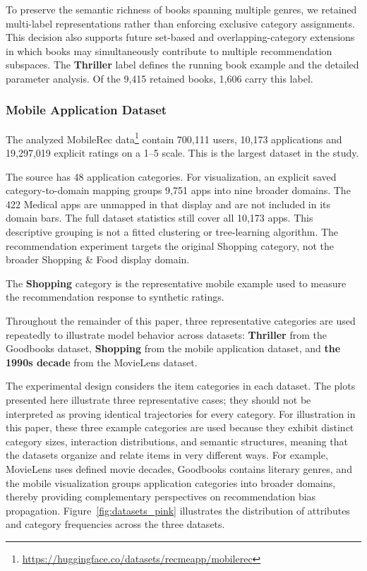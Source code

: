 \documentclass[information,article,submit,pdftex,moreauthors]{Definitions/mdpi}
\begin{document}
To preserve the semantic richness of books spanning multiple genres, we retained multi-label representations rather than enforcing exclusive category assignments. This decision also supports future set-based and overlapping-category extensions in which books may simultaneously contribute to multiple recommendation subspaces.
The \textbf{Thriller} label defines the running book example and the detailed parameter analysis. Of the 9,415 retained books, 1,606 carry this label. 
\label{sec:thriller-example}

\subsubsection{Mobile Application Dataset}

The analyzed MobileRec data\footnote{\url{https://huggingface.co/datasets/recmeapp/mobilerec}} contain 700,111 users, 10,173 applications and 19,297,019 explicit ratings on a 1--5 scale. This is the largest dataset in the study.

The source has 48 application categories. For visualization, an explicit saved category-to-domain mapping groups 9,751 apps into nine broader domains. The 422 Medical apps are unmapped in that display and are not included in its domain bars. The full dataset statistics still cover all 10,173 apps. This descriptive grouping is not a fitted clustering or tree-learning algorithm. The recommendation experiment targets the original Shopping category, not the broader Shopping \& Food display domain.

The \textbf{Shopping} category is the representative mobile example used to measure the recommendation response to synthetic ratings.

Throughout the remainder of this paper, three representative categories are used repeatedly to illustrate model behavior across datasets: \textbf{Thriller} from the Goodbooks dataset, \textbf{Shopping} from the mobile application dataset, and \textbf{the 1990s decade} from the MovieLens dataset.

The experimental design considers the item categories in each dataset. The plots presented here illustrate three representative cases; they should not be interpreted as proving identical trajectories for every category. For illustration in this paper, these three example categories are used because they exhibit distinct category sizes, interaction distributions, and semantic structures, meaning that the datasets organize and relate items in very different ways. For example, MovieLens uses defined movie decades, Goodbooks contains literary genres, and the mobile visualization groups application categories into broader domains, thereby providing complementary perspectives on recommendation bias propagation. Figure~\ref{fig:datasets_pink} illustrates the distribution of attributes and category frequencies across the three datasets.
\end{document}
